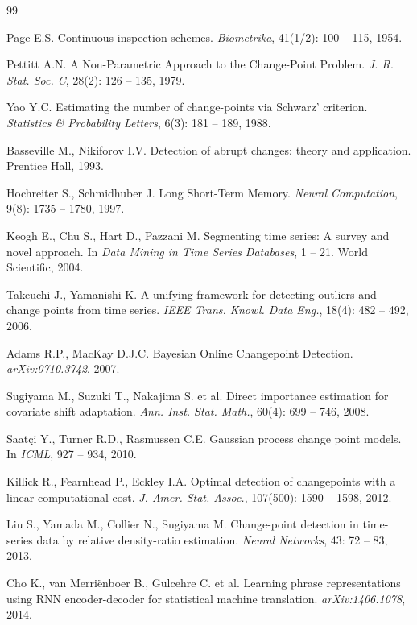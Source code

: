 \documentclass[12pt,a4paper]{article}
\begin{document}
\begin{thebibliography}{99}

 Page E.S. Continuous inspection schemes. \textit{Biometrika}, 41(1/2): 100 -- 115, 1954.

 Pettitt A.N. A Non-Parametric Approach to the Change-Point Problem. \textit{J. R. Stat. Soc. C}, 28(2): 126 -- 135, 1979.

 Yao Y.C. Estimating the number of change-points via Schwarz' criterion. \textit{Statistics \& Probability Letters}, 6(3): 181 -- 189, 1988.

 Basseville M., Nikiforov I.V. Detection of abrupt changes: theory and application. Prentice Hall, 1993.

 Hochreiter S., Schmidhuber J. Long Short-Term Memory. \textit{Neural Computation}, 9(8): 1735 -- 1780, 1997.

 Keogh E., Chu S., Hart D., Pazzani M. Segmenting time series: A survey and novel approach. In \textit{Data Mining in Time Series Databases}, 1 -- 21. World Scientific, 2004.

 Takeuchi J., Yamanishi K. A unifying framework for detecting outliers and change points from time series. \textit{IEEE Trans. Knowl. Data Eng.}, 18(4): 482 -- 492, 2006.

 Adams R.P., MacKay D.J.C. Bayesian Online Changepoint Detection. \textit{arXiv:0710.3742}, 2007.

 Sugiyama M., Suzuki T., Nakajima S. et al. Direct importance estimation for covariate shift adaptation. \textit{Ann. Inst. Stat. Math.}, 60(4): 699 -- 746, 2008.

 Saatçi Y., Turner R.D., Rasmussen C.E. Gaussian process change point models. In \textit{ICML}, 927 -- 934, 2010.

 Killick R., Fearnhead P., Eckley I.A. Optimal detection of changepoints with a linear computational cost. \textit{J. Amer. Stat. Assoc.}, 107(500): 1590 -- 1598, 2012.

 Liu S., Yamada M., Collier N., Sugiyama M. Change-point detection in time-series data by relative density-ratio estimation. \textit{Neural Networks}, 43: 72 -- 83, 2013.

 Cho K., van Merri{\"e}nboer B., Gulcehre C. et al. Learning phrase representations using RNN encoder-decoder for statistical machine translation. \textit{arXiv:1406.1078}, 2014.


\end{thebibliography}
\end{document}
